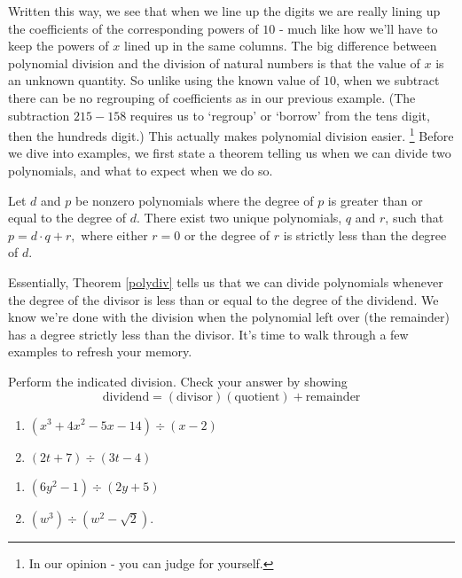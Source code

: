\documentclass{ximera}
\begin{document}
\setlength\arraycolsep{5pt}
\setlength\extrarowheight{0pt}

Written this way, we see that when we line up the digits we are really lining up the coefficients of the corresponding powers of $10$ - much like how we'll have to keep the powers of $x$ lined up in the same columns.  The big difference between polynomial division and the division of natural numbers is that the value of $x$ is an unknown quantity.  So unlike using the known value of $10$, when we subtract there can be no regrouping of coefficients as in our previous example. (The subtraction $215 - 158$ requires us to `regroup' or `borrow' from the tens digit, then the hundreds digit.) This actually makes polynomial division easier.%
\footnote{In our opinion - you can judge for yourself.}
Before we dive into examples, we first state a theorem telling us when we can divide two polynomials, and what to expect when we do so.

\begin{theorem}
    \label{polydiv}
    Let $d$ and $p$ be nonzero polynomials where the degree of $p$ is greater than or equal to the degree of $d$.  There exist two unique polynomials, $q$ and $r$, such that $p = d \cdot q + r,$ where either $r = 0$ or the degree of $r$ is strictly less than the degree of $d$.
\end{theorem}

Essentially, Theorem \ref{polydiv} tells us that we can divide polynomials whenever the degree of the divisor is less than or equal to the degree of the dividend.  We know we're done with the division when the polynomial left over (the remainder) has a degree strictly less than the divisor.  It's time to walk through a few examples to refresh your memory.

\begin{example}
    \label{polynomiallongdivex}  Perform the indicated division.  Check your answer by showing 
    \[
        \text{dividend} = (\text{divisor})( \text{quotient}) + \text{remainder}
    \]
    \begin{multicols}{2}
        \begin{enumerate}
            \item  $\left(x^3 + 4x^2 - 5x - 14\right) \div (x-2)$
            \item  $\left(2t +  7\right) \div \left(3t - 4\right)$
        \end{enumerate}
    \end{multicols}
    \begin{multicols}{2}
        \begin{enumerate}
            \item  $\left(6y^2 - 1 \right) \div \left(2y + 5\right)$
            \item  $\left(w^3 \right) \div \left(w^2 - \sqrt{2}\right)$.
        \end{enumerate}
    \end{multicols}
\end{example}
\end{document}
